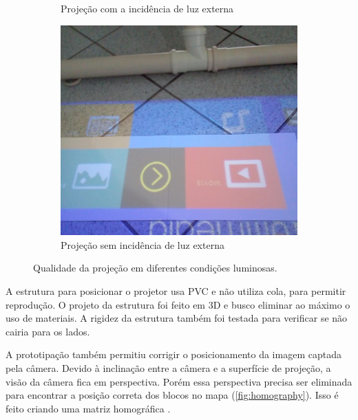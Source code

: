 \begin{figure}[b]
\begin{subfigure}{.33\textwidth}
        \caption{Projeção com a incidência de luz externa}
        \label{fig:projection_day}
    \end{subfigure}%
    \begin{subfigure}{.33\textwidth}
        \centering
        \includegraphics[width=.9\linewidth,fbox]{figs/projection_night.png}
        \caption{Projeção sem incidência de luz externa}
        \label{fig:projection_night}
    \end{subfigure}%
    \caption{Qualidade da projeção em diferentes condições luminosas.}
    \sourceauthor
    \label{fig:proj_light}
\end{figure}
A estrutura para posicionar o projetor usa PVC e não utiliza cola, para permitir reprodução. O projeto da estrutura foi feito em 3D e busco eliminar ao máximo o uso de materiais. A rigidez da estrutura também foi testada para verificar se não cairia para os lados.

A prototipação também permitiu corrigir o posicionamento da imagem captada pela câmera. Devido à inclinação entre a câmera e a superfície de projeção, a visão da câmera fica em perspectiva. Porém essa perspectiva precisa ser eliminada para encontrar a posição correta dos blocos no mapa (\autoref{fig:homography}). Isso é feito criando uma matriz homográfica \cite{dubrofsky_homography_2009}. 

